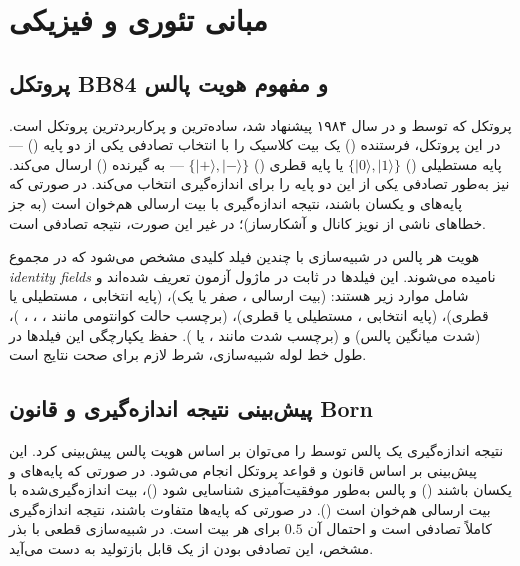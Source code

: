 \section{مبانی تئوری و فیزیکی}

\subsection{پروتکل BB84 و مفهوم هویت پالس}

پروتکل  که توسط  و  در سال ۱۹۸۴ پیشنهاد شد، ساده‌ترین و پرکاربردترین پروتکل  است. در این پروتکل، فرستنده () یک بیت کلاسیک را با انتخاب تصادفی یکی از دو پایه () — پایه مستطیلی () $\{|0\rangle, |1\rangle\}$ یا پایه قطری () $\{|+\rangle, |-\rangle\}$ — به گیرنده () ارسال می‌کند.  نیز به‌طور تصادفی یکی از این دو پایه را برای اندازه‌گیری انتخاب می‌کند. در صورتی که پایه‌های  و  یکسان باشند، نتیجه اندازه‌گیری  با بیت ارسالی  هم‌خوان است (به جز خطاهای ناشی از نویز کانال و آشکارساز)؛ در غیر این صورت، نتیجه تصادفی است.

هویت هر پالس در شبیه‌سازی  با چندین فیلد کلیدی مشخص می‌شود که در مجموع \emph{identity fields} نامیده می‌شوند. این فیلدها در ثابت  در ماژول آزمون تعریف شده‌اند و شامل موارد زیر هستند:  (بیت ارسالی ، صفر یا یک)،  (پایه انتخابی ، مستطیلی یا قطری)،  (پایه انتخابی ، مستطیلی یا قطری)،  (برچسب حالت کوانتومی مانند ، ، ، )،  (شدت میانگین پالس) و  (برچسب شدت مانند ،  یا ). حفظ یکپارچگی این فیلدها در طول خط لوله شبیه‌سازی، شرط لازم برای صحت نتایج است.

\subsection{پیش‌بینی نتیجه اندازه‌گیری و قانون Born}

نتیجه اندازه‌گیری یک پالس  توسط  را می‌توان بر اساس هویت پالس پیش‌بینی کرد. این پیش‌بینی بر اساس قانون  و قواعد پروتکل  انجام می‌شود. در صورتی که پایه‌های  و  یکسان باشند () و پالس به‌طور موفقیت‌آمیزی شناسایی شود ()، بیت اندازه‌گیری‌شده با بیت ارسالی هم‌خوان است (). در صورتی که پایه‌ها متفاوت باشند، نتیجه اندازه‌گیری کاملاً تصادفی است و احتمال آن $0.5$ برای هر بیت است. در شبیه‌سازی قطعی با بذر مشخص، این تصادفی بودن از یک  قابل بازتولید به دست می‌آید.


